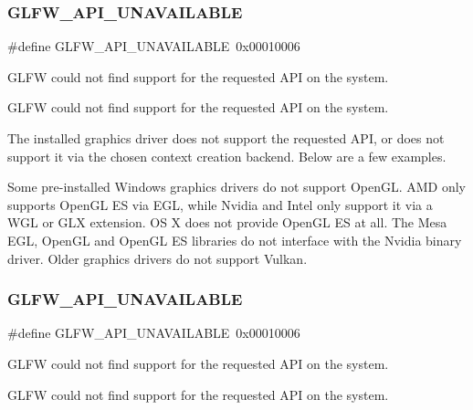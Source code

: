 \subsubsection{\texorpdfstring{G\+L\+F\+W\+\_\+\+A\+P\+I\+\_\+\+U\+N\+A\+V\+A\+I\+L\+A\+B\+LE}{GLFW\_API\_UNAVAILABLE}\hspace{0.1cm}{\footnotesize\ttfamily [2/5]}}
{\footnotesize\ttfamily \#define G\+L\+F\+W\+\_\+\+A\+P\+I\+\_\+\+U\+N\+A\+V\+A\+I\+L\+A\+B\+LE~0x00010006}



G\+L\+FW could not find support for the requested A\+PI on the system. 

G\+L\+FW could not find support for the requested A\+PI on the system.

The installed graphics driver does not support the requested A\+PI, or does not support it via the chosen context creation backend. Below are a few examples.

\begin{DoxyParagraph}{}
Some pre-\/installed Windows graphics drivers do not support Open\+GL. A\+MD only supports Open\+GL ES via E\+GL, while Nvidia and Intel only support it via a W\+GL or G\+LX extension. OS X does not provide Open\+GL ES at all. The Mesa E\+GL, Open\+GL and Open\+GL ES libraries do not interface with the Nvidia binary driver. Older graphics drivers do not support Vulkan. 
\end{DoxyParagraph}
\mbox{\label{group__errors_ga56882b290db23261cc6c053c40c2d08e}} 
\subsubsection{\texorpdfstring{G\+L\+F\+W\+\_\+\+A\+P\+I\+\_\+\+U\+N\+A\+V\+A\+I\+L\+A\+B\+LE}{GLFW\_API\_UNAVAILABLE}\hspace{0.1cm}{\footnotesize\ttfamily [3/5]}}
{\footnotesize\ttfamily \#define G\+L\+F\+W\+\_\+\+A\+P\+I\+\_\+\+U\+N\+A\+V\+A\+I\+L\+A\+B\+LE~0x00010006}



G\+L\+FW could not find support for the requested A\+PI on the system. 

G\+L\+FW could not find support for the requested A\+PI on the system.

